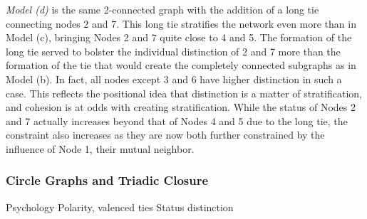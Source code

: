 \documentclass[12pt]{article}
\begin{document}
\textit{Model (d)} is the same 2-connected graph with the addition of a long tie connecting nodes 2 and 7. This long tie stratifies the network even more than in Model (c), bringing Nodes 2 and 7 quite close to 4 and 5. The formation of the long tie served to bolster the individual distinction of 2 and 7 more than the formation of the tie that would create the completely connected subgraphs as in Model (b). In fact, all nodes except 3 and 6 have higher distinction in such a case. This reflects the positional idea that distinction is a matter of stratification, and cohesion is at odds with creating stratification. While the status of Nodes 2 and 7 actually increases beyond that of Nodes 4 and 5 due to the long tie, the constraint also 
increases as they are now both further constrained by the influence of Node 1, their mutual neighbor.   

\subsubsection{Circle Graphs and Triadic Closure}

Psychology
Polarity, valenced ties 
Status distinction


\end{document}
